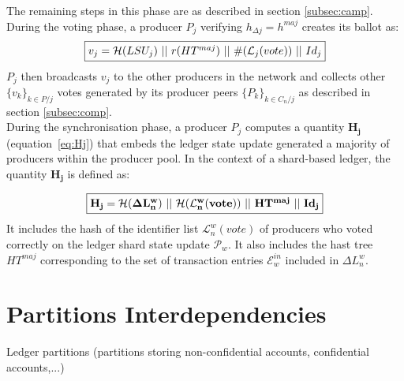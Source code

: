 The remaining steps in this phase are as described in section \ref{subsec:camp}.\\

During the voting phase, a producer $P_j$ verifying $h_{\Delta j}=h^{maj}$ creates its ballot as:
\begin{equation}
\label{eq:vj_shard}
\fbox{$v_j = \mathcal{H}(LSU_j)~||~r(HT^{maj})~||~\#(\mathcal{L}_j(vote))~||~Id_j$}
\end{equation}
$P_j$ then broadcasts $v_j$ to the other producers in the network and collects other $\{v_k\}_{k \in P/j}$ votes generated by its producer peers $\{P_k\}_{k \in C_n/j}$ as described in section \ref{subsec:comp}.\\

During the synchronisation phase, a producer $P_j$ computes a quantity $\mathbf{H_{j}}$ (equation~\eqref{eq:Hj}) that embeds the ledger state update generated a majority of producers within the producer pool. In the context of a shard-based ledger, the  quantity $\mathbf{H_{j}}$ is defined as:

 \begin{equation} 
\fbox{$\mathbf{H_{j} = \mathcal{H}(\Delta L^w_n)~||~\mathcal{H}(\mathcal{L}^{w}_{n}(vote))~||~HT^{maj}~||~Id_j}$}
\label{eq:Hj_shard}
\end{equation}
It includes the hash of the identifier list $\mathcal{L}^{w}_{n}(vote)$ of producers who voted correctly on the ledger shard state update $\mathcal{P}_w$.
It also includes the hast tree $HT^{maj}$ corresponding to the set of transaction entries $\mathcal{E}^{in}_w$ included in $\Delta L^w_n$. 

\section{Partitions Interdependencies}

Ledger partitions (partitions storing non-confidential accounts, confidential accounts,...)